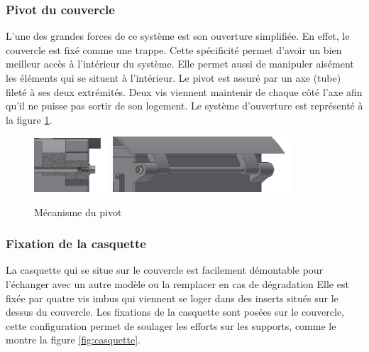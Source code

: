 \subsubsection{Pivot du couvercle}

L’une des grandes forces de ce système est son ouverture simplifiée. En effet, le couvercle est fixé 
comme une trappe. Cette spécificité permet d’avoir un bien meilleur accès à l’intérieur du système. 
Elle permet aussi de manipuler aisément les éléments qui se situent à l’intérieur. Le 
pivot est assuré par un axe (tube) fileté à ses deux extrémités. Deux vis viennent maintenir de chaque 
côté l’axe afin qu’il ne puisse pas sortir de son logement. Le système d'ouverture est représenté à la 
figure \ref{fig:pivot}.

\begin{figure}[H]
    \centering
    \includegraphics[width=0.25\textwidth]{Images/photos_PGA/pivotcoupe.PNG}
    \includegraphics[width=0.6\textwidth]{Images/photos_PGA/pivotnormal.PNG}
    \caption{Mécanisme du pivot}
    \label{fig:pivot}
\end{figure}

\subsubsection{Fixation de la casquette}

La casquette qui se situe sur le couvercle est facilement démontable pour l'échanger avec un autre modèle ou 
la remplacer en cas de dégradation Elle est fixée par quatre vis imbus qui viennent se loger dans des inserts 
situés sur le dessus du couvercle. Les fixations de la casquette sont posées sur le couvercle, cette 
configuration permet de soulager les efforts sur les supports, comme le montre la figure \ref{fig:casquette}.

